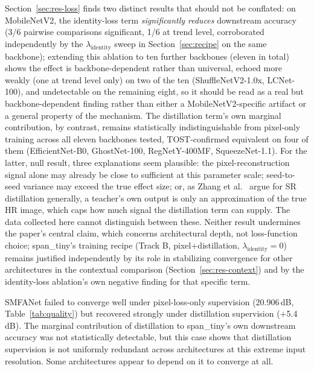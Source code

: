 \documentclass[pdflatex,sn-vancouver-num]{sn-jnl}
\begin{document}
Section~\ref{sec:res-loss} finds two distinct results that should not be conflated: on MobileNetV2, the identity-loss term \emph{significantly reduces} downstream accuracy (3/6 pairwise comparisons significant, 1/6 at trend level, corroborated independently by the $\lambda_{\text{identity}}$ sweep in Section~\ref{sec:recipe} on the same backbone); extending this ablation to ten further backbones (eleven in total) shows the effect is backbone-dependent rather than universal, echoed more weakly (one at trend level only) on two of the ten (ShuffleNetV2-1.0x, LCNet-100), and undetectable on the remaining eight, so it should be read as a real but backbone-dependent finding rather than either a MobileNetV2-specific artifact or a general property of the mechanism. The distillation term's own marginal contribution, by contrast, remains statistically indistinguishable from pixel-only training across all eleven backbones tested, TOST-confirmed equivalent on four of them (EfficientNet-B0, GhostNet-100, RegNetY-400MF, SqueezeNet-1.1). For the latter, null result, three explanations seem plausible: the pixel-reconstruction signal alone may already be close to sufficient at this parameter scale; seed-to-seed variance may exceed the true effect size; or, as Zhang et al.~\cite{zhang2024dukd} argue for SR distillation generally, a teacher's own output is only an approximation of the true HR image, which caps how much signal the distillation term can supply. The data collected here cannot distinguish between these. Neither result undermines the paper's central claim, which concerns architectural depth, not loss-function choice; span\_tiny's training recipe (Track B, pixel+distillation, $\lambda_{\text{identity}}{=}0$) remains justified independently by its role in stabilizing convergence for other architectures in the contextual comparison (Section~\ref{sec:res-context}) and by the identity-loss ablation's own negative finding for that specific term.

SMFANet failed to converge well under pixel-loss-only supervision (20.906\,dB, Table~\ref{tab:quality}) but recovered strongly under distillation supervision (+5.4\,dB). The marginal contribution of distillation to span\_tiny's own downstream accuracy was not statistically detectable, but this case shows that distillation supervision is not uniformly redundant across architectures at this extreme input resolution. Some architectures appear to depend on it to converge at all.
\end{document}
